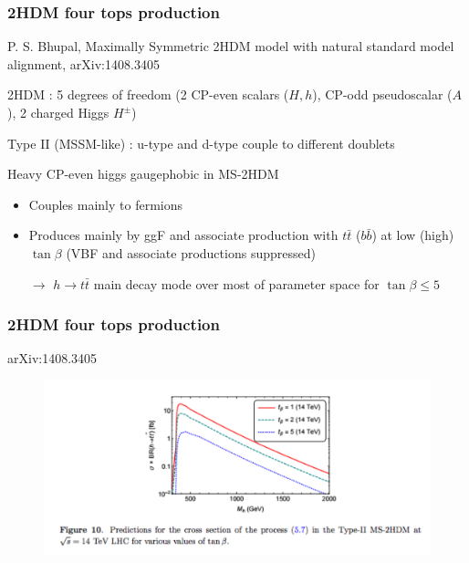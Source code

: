 \begin{frame}[plain]
\frametitle{2HDM four tops production}
\begin{maliste}
\item P. S. Bhupal, Maximally Symmetric 2HDM model with natural standard model alignment, arXiv:1408.3405
\item 2HDM : 5 degrees of freedom (2 CP-even scalars ($H,h$), CP-odd pseudoscalar ($A$), 2 charged Higgs $H^\pm$)
\item Type II (MSSM-like) : u-type and d-type couple to different doublets
\item Heavy CP-even higgs gaugephobic in MS-2HDM
\begin{itemize}
\item Couples mainly to fermions
\item Produces mainly by ggF and associate production with $t\bar{t}$ ($b\bar{b}$) at low (high) $\tan\beta$ (VBF and associate productions suppressed)
\item[$\rightarrow$] $h\rightarrow t\bar{t}$ main decay mode over most of parameter space for $\tan\beta\leq5$
\end{itemize}
\end{maliste}
\end{frame}

\begin{frame}[plain]
\frametitle{2HDM four tops production}

arXiv:1408.3405
\begin{figure}[!htb]
\begin{center}
\hspace*{-1cm}
\includegraphics[width=1.1\textwidth]{Figures/FourTops/2HDM_TypeII_4tops_XsecVsMh.png}
\end{center}
\end{figure}

\end{frame}

